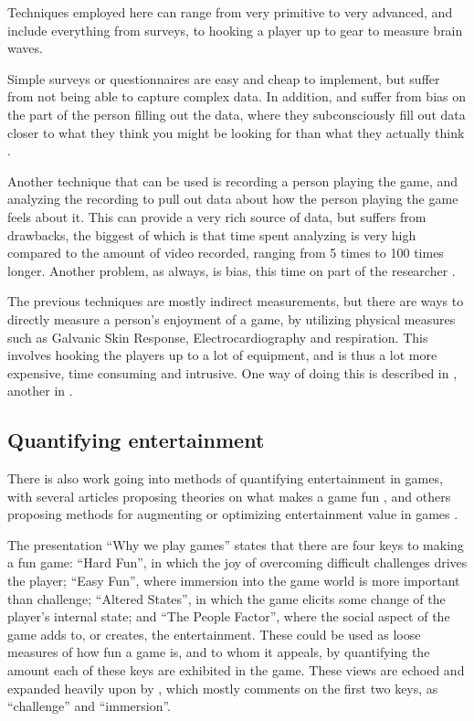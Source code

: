 \documentclass[]{report}
\begin{document}
Techniques employed here can range from very primitive to very advanced, and
include everything from surveys, to hooking a player up to gear to measure brain
waves.

Simple surveys or questionnaires are easy and cheap to implement, but suffer from
not being able to capture complex data. In addition, and suffer from bias on the
part of the person filling out the data, where they subconsciously fill out data
closer to what they think you might be looking for than what they actually think
\citep{mandryk2006using}.

Another technique that can be used is recording a person playing the game, and
analyzing the recording to pull out data about how the person playing the game
feels about it. This can provide a very rich source of data, but suffers from
drawbacks, the biggest of which is that time spent analyzing is very high
compared to the amount of video recorded, ranging from 5 times to 100 times
longer. Another problem, as always, is bias, this time on part of the
researcher \citep{mandryk2006using}.

The previous techniques are mostly indirect measurements, but there are ways to
directly measure a person's enjoyment of a game, by utilizing physical measures
such as Galvanic Skin Response, Electrocardiography and respiration. This
involves hooking the players up to a lot of equipment, and is thus a lot more
expensive, time consuming and intrusive. One way of doing this is described in
\citet{mandryk2006using}, another in \citet{yannakakis2008entertainment}.

\subsection{Quantifying entertainment}
\label{sec:quant-entert}

There is also work going into methods of quantifying entertainment in games,
with several articles proposing theories on what makes a game fun
\citep[e.g.][]{malone1981makes,read2002endurability,
  federoff2002heuristics,lazzaro2004we,koster2004theory}, and others proposing
methods for augmenting or optimizing entertainment value in games
\citep[e.g.][]{yannakakis2009real,yannakakis2008model,yannakakis2007towards,yannakakis2004interactive}.

The presentation ``Why we play games'' \citep{lazzaro2004we} states that there
are four keys to making a fun game: ``Hard Fun'', in which the joy of overcoming
difficult challenges drives the player; ``Easy Fun'', where immersion into the
game world is more important than challenge; ``Altered States'', in which the
game elicits some change of the player's internal state; and ``The People
Factor'', where the social aspect of the game adds to, or creates, the
entertainment. These could be used as loose measures of how fun a game is, and
to whom it appeals, by quantifying the amount each of these keys are exhibited
in the game. These views are echoed and expanded heavily upon by
\citet{federoff2002heuristics}, which mostly comments on the first two keys, as
``challenge'' and ``immersion''.
\end{document}
